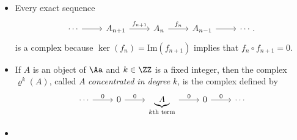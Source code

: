 \begin{examples*} $\;$\\%
\renewcommand{\labelitemi}{$\square$}
\begin{itemize}
\item Every exact sequence
  \[
    \begin{tikzcd}[row sep=large]
      \cdots \arrow[r] & A_{n+1} \arrow[r,"f_{n+1}"] & A_n \arrow[r,"f_n"] & A_{n-1} \arrow[r] & \cdots.
    \end{tikzcd}
  \]
  is a complex because $\ker(f_n)=\text{Im}(f_{n+1})$ implies that $f_n\circ f_{n+1}=0$.
\item If $A$ is an object of $\Aa$ and $k\in\ZZ$ is a fixed integer, then the complex
  $\varrho^k(A)$, called $A$ \emph{concentrated in degree} $k$, is the complex defined by
  \[
    \begin{tikzcd}
      \cdots \arrow[r,"0"] &
      0 \arrow[r,"0"] &
      \underset{k\text{th term}}{\underbrace{A}} \arrow[r,"0"] &
      0 \arrow[r,"0"] &
      \cdots
    \end{tikzcd}
  \]
  
\end{itemize}%

\renewcommand{\labelitemi}{$\boxtimes$}
\begin{itemize}
\item
\end{itemize}

  
\end{examples*}